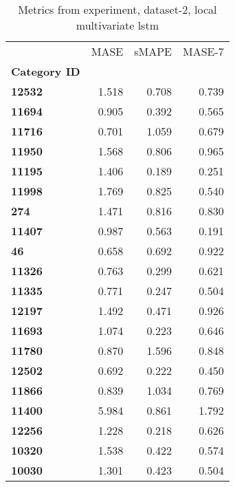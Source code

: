\begin{table}[h]
\centering
\caption{Metrics from experiment, dataset-2, local multivariate lstm}
\label{table:local-multivariate-lstm-dataset-2}
\begin{tabular}{lrrr}
\toprule
{} &   MASE &  sMAPE &  MASE-7 \\
\textbf{Category ID} &        &        &         \\
\midrule
\textbf{12532      } &  1.518 &  0.708 &   0.739 \\
\textbf{11694      } &  0.905 &  0.392 &   0.565 \\
\textbf{11716      } &  0.701 &  1.059 &   0.679 \\
\textbf{11950      } &  1.568 &  0.806 &   0.965 \\
\textbf{11195      } &  1.406 &  0.189 &   0.251 \\
\textbf{11998      } &  1.769 &  0.825 &   0.540 \\
\textbf{274        } &  1.471 &  0.816 &   0.830 \\
\textbf{11407      } &  0.987 &  0.563 &   0.191 \\
\textbf{46         } &  0.658 &  0.692 &   0.922 \\
\textbf{11326      } &  0.763 &  0.299 &   0.621 \\
\textbf{11335      } &  0.771 &  0.247 &   0.504 \\
\textbf{12197      } &  1.492 &  0.471 &   0.926 \\
\textbf{11693      } &  1.074 &  0.223 &   0.646 \\
\textbf{11780      } &  0.870 &  1.596 &   0.848 \\
\textbf{12502      } &  0.692 &  0.222 &   0.450 \\
\textbf{11866      } &  0.839 &  1.034 &   0.769 \\
\textbf{11400      } &  5.984 &  0.861 &   1.792 \\
\textbf{12256      } &  1.228 &  0.218 &   0.626 \\
\textbf{10320      } &  1.538 &  0.422 &   0.574 \\
\textbf{10030      } &  1.301 &  0.423 &   0.504 \\
\bottomrule
\end{tabular}
\end{table}
